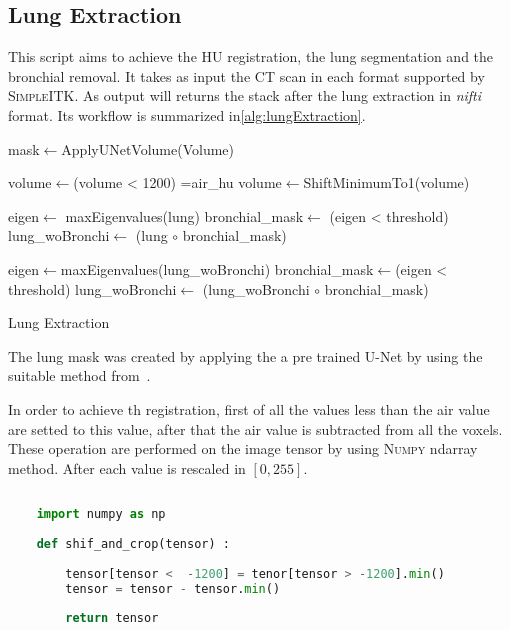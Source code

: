 \documentclass{standalone}
\begin{document}
	\subsection{Lung Extraction}
	
	This script aims to achieve the HU registration, the lung segmentation and the bronchial removal. It takes as input the CT scan in each format supported by \textsc{SimpleITK}. As output will returns the stack after the lung extraction in \textit{nifti} format.  Its workflow is summarized in\ref{alg:lungExtraction}.
	
		 
	\begin{algorithm}
		
		\SetAlgoLined
		\DontPrintSemicolon
	
		\;
		
		mask$\leftarrow$ApplyUNetVolume(Volume)\;
		
		volume$\leftarrow$(volume < 1200) =air\_hu\;
		volume$\leftarrow$ShiftMinimumTo1(volume)\;
		
		\;
		
		eigen$\leftarrow$ maxEigenvalues(lung)\;
		bronchial\_mask$\leftarrow$ (eigen < threshold)\;
		lung\_woBronchi$\leftarrow$ (lung $\circ$ bronchial\_mask)\;
		
		\;
		
		eigen$\leftarrow$maxEigenvalues(lung\_woBronchi)\;
		bronchial\_mask$\leftarrow$(eigen < threshold)\;
		lung\_woBronchi$\leftarrow$ (lung\_woBronchi $\circ$ bronchial\_mask)\;
	
		\caption{Lung Extraction}\label{alg:lungExtraction}
		
	\end{algorithm}
	
	
	The lung mask was created by applying the a pre trained U-Net by using the suitable method from~\cite{REP:lungmask}. 

	In order to achieve th registration, first of all the values less than the air value are setted to this value, after that the air value is subtracted from all the voxels. These operation are performed on the image tensor by using \textsc{Numpy} ndarray method. After each value is rescaled in $[0, 255]$. 
	
	\lstset{style=python}
	\begin{lstlisting}[language=python, caption=HU registering function, label=code:saf]
		
	import numpy as np
		
	def shif_and_crop(tensor) :
		
		tensor[tensor <  -1200] = tenor[tensor > -1200].min()
		tensor = tensor - tensor.min()
	
		return tensor
	\end{lstlisting}
\end{document}
